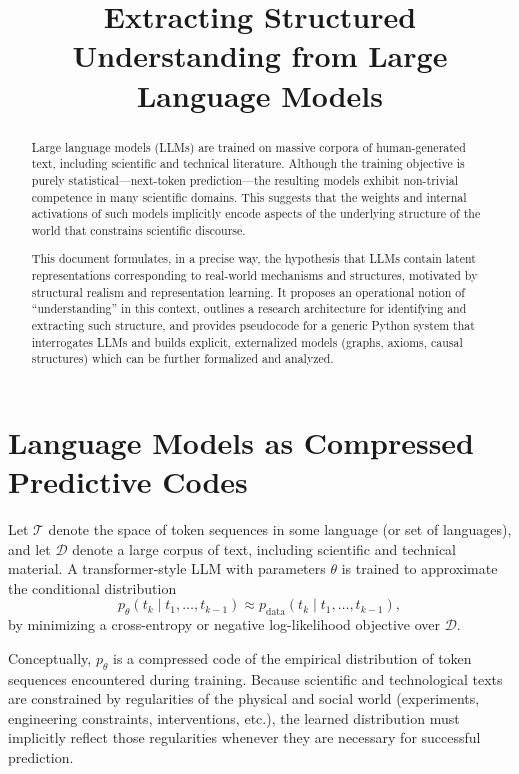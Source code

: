 \documentclass[11pt]{article}
\title{Extracting Structured Understanding from Large Language Models}
\author{}
\date{}
\begin{document}
	
	\maketitle
	
	\begin{abstract}
		Large language models (LLMs) are trained on massive corpora of human-generated text, including scientific and technical literature. Although the training objective is purely statistical---next-token prediction---the resulting models exhibit non-trivial competence in many scientific domains. This suggests that the weights and internal activations of such models implicitly encode aspects of the underlying structure of the world that constrains scientific discourse.
		
		This document formulates, in a precise way, the hypothesis that LLMs contain latent representations corresponding to real-world mechanisms and structures, motivated by structural realism and representation learning. It proposes an operational notion of ``understanding'' in this context, outlines a research architecture for identifying and extracting such structure, and provides pseudocode for a generic Python system that interrogates LLMs and builds explicit, externalized models (graphs, axioms, causal structures) which can be further formalized and analyzed.
	\end{abstract}
	
	\section{Language Models as Compressed Predictive Codes}
	
	Let $\mathcal{T}$ denote the space of token sequences in some language (or set of languages), and let $\mathcal{D}$ denote a large corpus of text, including scientific and technical material. A transformer-style LLM with parameters $\theta$ is trained to approximate the conditional distribution
	\begin{equation}
		p_\theta(t_{k} \mid t_1,\dots,t_{k-1}) \approx p_{\text{data}}(t_{k} \mid t_1,\dots,t_{k-1}),
	\end{equation}
	by minimizing a cross-entropy or negative log-likelihood objective over $\mathcal{D}$.
	
	Conceptually, $p_\theta$ is a compressed code of the empirical distribution of token sequences encountered during training. Because scientific and technological texts are constrained by regularities of the physical and social world (experiments, engineering constraints, interventions, etc.), the learned distribution must implicitly reflect those regularities whenever they are necessary for successful prediction.
	
\end{document}
